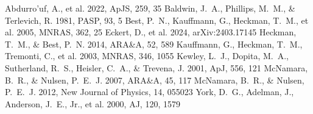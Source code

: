\documentclass[twocolumn]{aastex631}
\begin{document}
\begin{thebibliography}{}
 Abdurro'uf, A., et al. 2022, ApJS, 259, 35
 Baldwin, J.~A., Phillips, M.~M., \& Terlevich, R. 1981, PASP, 93, 5
 Best, P.~N., Kauffmann, G., Heckman, T.~M., et al. 2005, MNRAS, 362, 25
 Eckert, D., et al. 2024, arXiv:2403.17145
 Heckman, T.~M., \& Best, P.~N. 2014, ARA\&A, 52, 589
 Kauffmann, G., Heckman, T.~M., Tremonti, C., et al. 2003, MNRAS, 346, 1055
 Kewley, L.~J., Dopita, M.~A., Sutherland, R.~S., Heisler, C.~A., \& Trevena, J. 2001, ApJ, 556, 121
 McNamara, B.~R., \& Nulsen, P.~E.~J. 2007, ARA\&A, 45, 117
 McNamara, B.~R., \& Nulsen, P.~E.~J. 2012, New Journal of Physics, 14, 055023
 York, D.~G., Adelman, J., Anderson, J.~E., Jr., et al. 2000, AJ, 120, 1579
\end{thebibliography}
\end{document}
